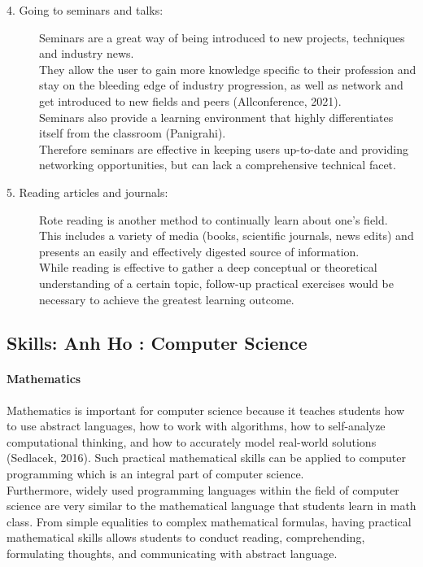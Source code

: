 \documentclass[a4paper, 11pt]{report}
\begin{document}
\begin{description}
		\item [4. Going to seminars and talks:] Seminars are a great way of being introduced to new projects, techniques and industry news.
		\\They allow the user to gain more knowledge specific to their profession and stay on the bleeding edge of industry progression, as well as network and get introduced to new fields and peers (Allconference, 2021). 
		\\Seminars also provide a learning environment that highly differentiates itself from the classroom (Panigrahi). 
		\\Therefore seminars are effective in keeping users up-to-date and providing networking opportunities, but can lack a comprehensive technical facet.
		
		\item [5. Reading articles and journals:] Rote reading is another method to continually learn about one's field. 
		\\This includes a variety of media (books, scientific journals, news edits) and presents an easily and effectively digested source of information.
		\\While reading is effective to gather a deep conceptual or theoretical understanding of a certain topic, follow-up practical exercises would be necessary to achieve the greatest learning outcome. 
		
		
	\end{description}
	
	
	\subsection{Skills: Anh Ho : Computer Science}
	\paragraph{Mathematics} Mathematics is important for computer science because it teaches students how to use abstract languages, how to work with algorithms, how to self-analyze computational thinking, and how to accurately model real-world solutions (Sedlacek, 2016). Such practical mathematical skills can be applied to computer programming which is an integral part of computer science. 
	\\Furthermore, widely used programming languages within the field of computer science are very similar to the mathematical language that students learn in math class. From simple equalities to complex mathematical formulas, having practical mathematical skills allows students to conduct reading, comprehending, formulating thoughts, and communicating with abstract language.
	
\end{document}
